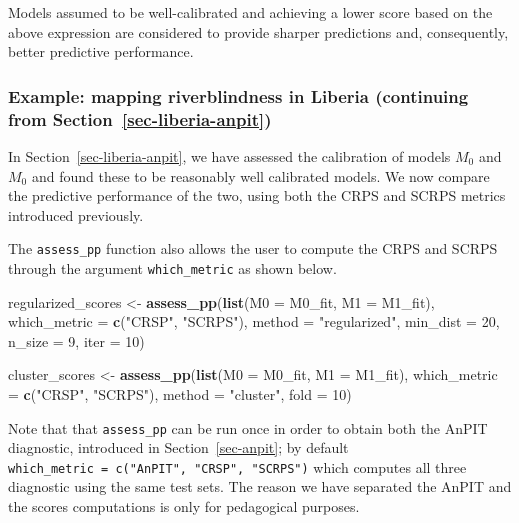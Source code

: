 \documentclass[
  letterpaper,
]{krantz}
\newenvironment{Shaded}{\begin{snugshade}}{\end{snugshade}}
\newcommand{\AttributeTok}[1]{\textcolor[rgb]{0.13,0.29,0.53}{#1}}
\newcommand{\DecValTok}[1]{\textcolor[rgb]{0.00,0.00,0.81}{#1}}
\newcommand{\FunctionTok}[1]{\textcolor[rgb]{0.13,0.29,0.53}{\textbf{#1}}}
\newcommand{\NormalTok}[1]{#1}
\newcommand{\OtherTok}[1]{\textcolor[rgb]{0.56,0.35,0.01}{#1}}
\newcommand{\StringTok}[1]{\textcolor[rgb]{0.31,0.60,0.02}{#1}}
\begin{document}
Models assumed to be well-calibrated and achieving a lower score based
on the above expression are considered to provide sharper predictions
and, consequently, better predictive performance.

\subsubsection{\texorpdfstring{Example: mapping riverblindness in
Liberia (continuing from
Section~\ref{sec-liberia-anpit})}{Example: mapping riverblindness in Liberia (continuing from Section~)}}\label{example-mapping-riverblindness-in-liberia-continuing-from-sec-liberia-anpit}

In Section~\ref{sec-liberia-anpit}, we have assessed the calibration of
models \(M_0\) and \(M_0\) and found these to be reasonably well
calibrated models. We now compare the predictive performance of the two,
using both the CRPS and SCRPS metrics introduced previously.

The \texttt{assess\_pp} function also allows the user to compute the
CRPS and SCRPS through the argument \texttt{which\_metric} as shown
below.

\begin{Shaded}
\begin{Highlighting}[]
\NormalTok{regularized\_scores }\OtherTok{\textless{}{-}} 
\FunctionTok{assess\_pp}\NormalTok{(}\FunctionTok{list}\NormalTok{(}\AttributeTok{M0 =}\NormalTok{ M0\_fit, }\AttributeTok{M1 =}\NormalTok{ M1\_fit),}
          \AttributeTok{which\_metric =} \FunctionTok{c}\NormalTok{(}\StringTok{"CRSP"}\NormalTok{, }\StringTok{"SCRPS"}\NormalTok{), }
          \AttributeTok{method =} \StringTok{"regularized"}\NormalTok{, }\AttributeTok{min\_dist =} \DecValTok{20}\NormalTok{,}
          \AttributeTok{n\_size =} \DecValTok{9}\NormalTok{, }\AttributeTok{iter =} \DecValTok{10}\NormalTok{)}

\NormalTok{cluster\_scores }\OtherTok{\textless{}{-}} 
\FunctionTok{assess\_pp}\NormalTok{(}\FunctionTok{list}\NormalTok{(}\AttributeTok{M0 =}\NormalTok{ M0\_fit, }\AttributeTok{M1 =}\NormalTok{ M1\_fit),}
          \AttributeTok{which\_metric =} \FunctionTok{c}\NormalTok{(}\StringTok{"CRSP"}\NormalTok{, }\StringTok{"SCRPS"}\NormalTok{), }
          \AttributeTok{method =} \StringTok{"cluster"}\NormalTok{, }\AttributeTok{fold =} \DecValTok{10}\NormalTok{)}
\end{Highlighting}
\end{Shaded}

Note that that \texttt{assess\_pp} can be run once in order to obtain
both the AnPIT diagnostic, introduced in Section~\ref{sec-anpit}; by
default \texttt{which\_metric\ =\ c("AnPIT",\ "CRSP",\ "SCRPS")} which
computes all three diagnostic using the same test sets. The reason we
have separated the AnPIT and the scores computations is only for
pedagogical purposes.
\end{document}
